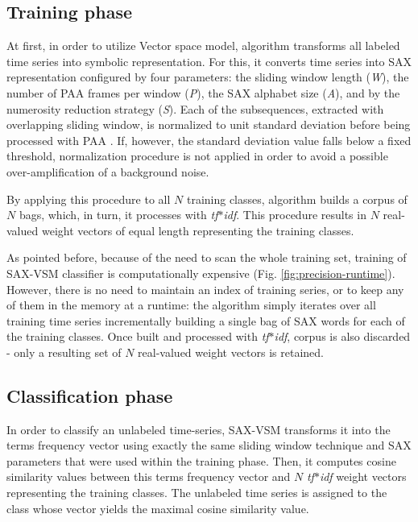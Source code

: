 \documentclass[conference]{IEEEtran}
\begin{document}
\subsection{Training phase}
At first, in order to utilize Vector space model, algorithm transforms all labeled 
time series into symbolic representation. For this, it converts time series into SAX
representation configured by four parameters: the sliding window 
length (\textit{W}), the number of PAA frames per window (\textit{P}), 
the SAX alphabet size (\textit{A}), and by the numerosity reduction strategy (\textit{S}). 
Each of the subsequences, extracted with overlapping sliding window, 
is normalized to unit standard deviation before being processed with PAA 
\cite{goldin_kanellakis}. 
If, however, the standard deviation value falls below a fixed threshold, normalization 
procedure is not applied in order to avoid a possible over-amplification of a 
background noise.

By applying this procedure to all $N$ training classes, algorithm builds a corpus 
of $N$ bags, which, in turn, it processes with \textit{tf$\ast$idf}. 
This procedure results in $N$ real-valued weight vectors of equal length 
representing the training classes. 

As pointed before, because of the need to scan the whole training set, 
training of SAX-VSM classifier is computationally expensive 
(Fig. \ref{fig:precision-runtime}). However, there is no need to maintain an index 
of training series, or to keep any of them in the memory at a runtime: 
the algorithm simply iterates over all training time series incrementally building 
a single bag of SAX words for each of the training classes. 
Once built and processed with \textit{tf$\ast$idf}, corpus is also discarded - 
only a resulting set of $N$ real-valued weight vectors is retained. 

\subsection{Classification phase}
In order to classify an unlabeled time-series, SAX-VSM transforms it into the 
terms frequency vector using exactly the same sliding window technique and SAX 
parameters that were used within the training phase. 
Then, it computes cosine similarity values between this terms frequency vector and 
$N$ \textit{tf$\ast$idf} weight vectors representing the training classes. 
The unlabeled time series is assigned to the class whose vector yields the maximal 
cosine similarity value.
\end{document}
